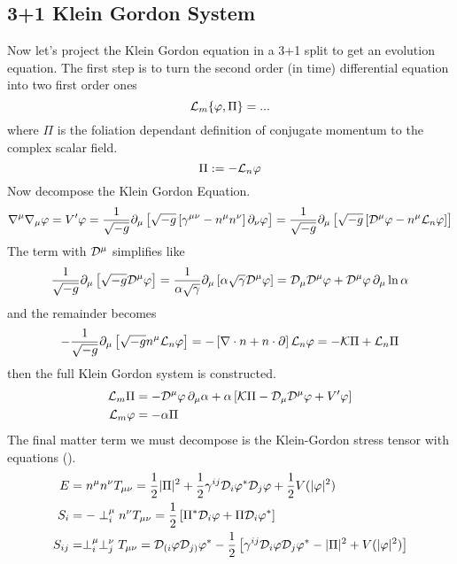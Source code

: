\subsection{3+1 Klein Gordon System}
Now let's project the Klein Gordon equation in a 3+1 split to get an evolution equation. The first step is to turn the second order (in time) differential equation into two first order ones
\begin{equation} \mathcal{L}_m \{\varphi,\Pi \} = ...\end{equation}
where $\Pi$ is the foliation dependant definition of conjugate momentum to the complex scalar field.
\begin{equation} \Pi:= -\mathcal{L}_n \varphi\end{equation}
Now decompose the Klein Gordon Equation.
\begin{equation} \nabla^\mu \nabla_\mu \varphi = V' \varphi = \frac{1}{\sqrt{-g}} \partial_\mu \left[ \sqrt{-g}\left[\gamma^{\mu\nu}-n^\mu n^\nu\right]\partial_\nu \varphi\right] = \frac{1}{\sqrt{-g}} \partial_\mu \left[ \sqrt{-g}\left[\mathcal{D}^\mu\varphi-n^\mu \mathcal{L}_n\varphi\right]\right] \end{equation}
The term with $\mathcal{D}^\mu$ simplifies like
\begin{equation}\frac{1}{\sqrt{-g}} \partial_\mu \left[ \sqrt{-g}\mathcal{D}^\mu\varphi\right] =  \frac{1}{\alpha\sqrt{\gamma}} \partial_\mu \left[\alpha\sqrt{\gamma}\mathcal{D}^\mu\varphi\right]  = \mathcal{D}_\mu \mathcal{D}^\mu \varphi + \mathcal{D}^\mu \varphi \,\partial_\mu \ln \alpha\end{equation}
and the remainder becomes
\begin{equation}-\frac{1}{\sqrt{-g}} \partial_\mu \left[ \sqrt{-g}n^\mu \mathcal{L}_n\varphi\right] = -\left[\nabla \cdot n + n\cdot \partial\right]\mathcal{L}_n\varphi = -\mathcal{K}\Pi + \mathcal{L}_n \Pi\end{equation}
then the full Klein Gordon system is constructed.
\begin{align}
 \mathcal{L}_m \Pi &= - \mathcal{D}^\mu\varphi\,\partial_\mu \alpha+\alpha\left[\mathcal{K}\Pi - \mathcal{D}_\mu \mathcal{D}^\mu \varphi  + V'\varphi\right] \\
 \mathcal{L}_m \varphi &= - \alpha\Pi\end{align}
The final matter term we must decompose is the Klein-Gordon stress tensor with equations (). \begin{align} E &=n^\mu n^\nu T_{\mu\nu} = \frac{1}{2}|\Pi|^2 + \frac{1}{2}\gamma^{ij}\mathcal{D}_i \varphi^* \mathcal{D}_j \varphi +\frac{1}{2}V(|\varphi|^2)
\\ S_i &= -\perp^\mu_i n^\nu T_{\mu\nu} =  \frac{1}{2}\left[\Pi^* \mathcal{D}_i \varphi  +  \Pi\mathcal{D}_i \varphi^* \right]
\\ S_{ij} &= \perp^\mu_i \perp^\nu_j T_{\mu\nu} = \mathcal{D}_{(i}\varphi\mathcal{D}_{j)}\varphi^* - \frac{1}{2}\left[ \gamma^{ij}\mathcal{D}_i\varphi\mathcal{D}_j\varphi^* - |\Pi|^2 + V(|\varphi|^2)\right]\end{align}

